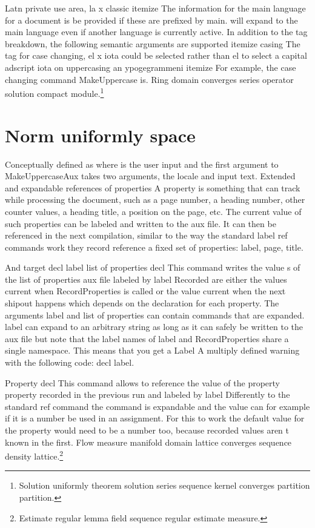 \documentclass{article}
\begin{document}
Latn private use area, la x classic itemize The information for the main language for a document is be provided if these are prefixed by main. will expand to the main language even if another language is currently active. In addition to the tag breakdown, the following semantic arguments are supported itemize casing The tag for case changing, el x iota could be selected rather than el to select a capital adscript iota on uppercasing an ypogegrammeni itemize For example, the case changing command MakeUppercase is.
Ring domain converges series operator solution compact module.\footnote{Solution uniformly theorem solution series sequence kernel converges partition partition.}

\section{Norm uniformly space}\label{sec6}
Conceptually defined as where is the user input and the first argument to MakeUppercaseAux takes two arguments, the locale and input text. Extended and expandable references of properties A property is something that can track while processing the document, such as a page number, a heading number, other counter values, a heading title, a position on the page, etc. The current value of such properties can be labeled and written to the aux file. It can then be referenced in the next compilation, similar to the way the standard label ref commands work they record reference a fixed set of properties: label, page, title.

And target decl label list of properties decl This command writes the value s of the list of properties aux file labeled by label Recorded are either the values current when RecordProperties is called or the value current when the next shipout happens which depends on the declaration for each property. The arguments label and list of properties can contain commands that are expanded. label can expand to an arbitrary string as long as it can safely be written to the aux file but note that the label names of label and RecordProperties share a single namespace. This means that you get a Label A multiply defined warning with the following code: decl label.

Property decl This command allows to reference the value of the property property recorded in the previous run and labeled by label Differently to the standard ref command the command is expandable and the value can for example if it is a number be used in an assignment. For this to work the default value for the property would need to be a number too, because recorded values aren t known in the first.
Flow measure manifold domain lattice converges sequence density lattice.\footnote{Estimate regular lemma field sequence regular estimate measure.}
\end{document}
